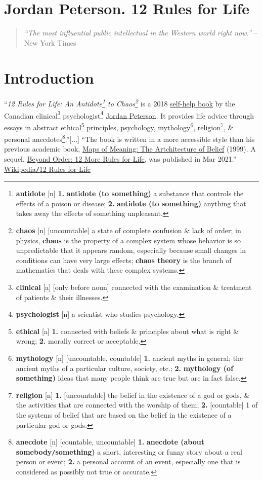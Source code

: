 \documentclass{article}
\begin{document}
\section{Jordan Peterson. 12 Rules for Life}

\begin{quotation}
	\textit{``The most influential public intellectual in the Western world right now.''} -- New York Times
\end{quotation}

\section*{Introduction}
``\textit{12 Rules for Life: An Antidote\footnote{\textbf{antidote} [n] \textbf{1.} \textbf{antidote (to something)} a substance that controls the effects of a poison or disease; \textbf{2.} \textbf{antidote (to something)} anything that takes away the effects of something unpleasant.} to Chaos\footnote{\textbf{chaos} [n] [uncountable] a state of complete confusion \& lack of order; in physics, \textbf{chaos} is the property of a complex system whose behavior is so unpredictable that it appears random, especially because small changes in conditions can have very large effects; \textbf{chaos theory} is the branch of mathematics that deals with these complex systems.}} is a 2018 \href{https://en.wikipedia.org/wiki/Self-help_book}{self-help book} by the Canadian clinical\footnote{\textbf{clinical} [a] [only before noun] connected with the examination \& treatment of patients \& their illnesses.} psychologist\footnote{\textbf{psychologist} [n] a scientist who studies psychology.} \href{https://en.wikipedia.org/wiki/Jordan_Peterson}{Jordan Peterson}. It provides life advice through essays in abstract ethical\footnote{\textbf{ethical} [a] \textbf{1.} connected with beliefs \& principles about what is right \& wrong; \textbf{2.} morally correct or acceptable.} principles, psychology, mythology\footnote{\textbf{mythology} [n] [uncountable, countable] \textbf{1.} ancient myths in general; the ancient myths of a particular culture, society, etc.; \textbf{2.} \textbf{mythology (of something)} ideas that many people think are true but are in fact false.}, religion\footnote{\textbf{religion} [n] \textbf{1.} [uncountable] the belief in the existence of a god or gods, \& the activities that are connected with the worship of them; \textbf{2.} [countable] 1 of the systems of belief that are based on the belief in the existence of a particular god or gods.}, \& personal anecdotes\footnote{\textbf{anecdote} [n] [countable, uncountable] \textbf{1.} \textbf{anecdote (about somebody{\tt/}something)} a short, interesting or funny story about a real person or event; \textbf{2.} a personal account of an event, especially one that is considered as possibly not true or accurate.}.''[$\ldots$] ``The book is written in a more accessible style than his previous academic book, \href{https://en.wikipedia.org/wiki/Maps_of_Meaning:_The_Architecture_of_Belief}{Maps of Meaning: The Artchitecture of Belief} (1999). A sequel, \href{https://en.wikipedia.org/wiki/Beyond_Order}{Beyond Order: 12 More Rules for Life}, was published in Mar 2021.'' -- \href{https://en.wikipedia.org/wiki/12_Rules_for_Life}{Wikipedia{\tt/}12 Rules for Life}
\end{document}
